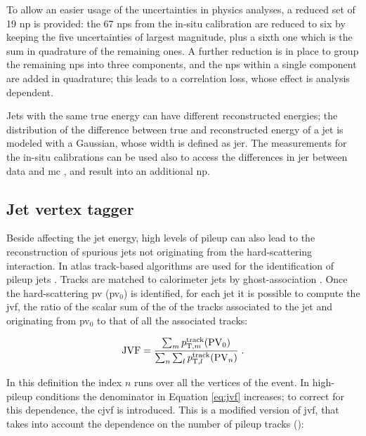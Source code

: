 To allow an easier usage of the uncertainties in physics analyses, a reduced set of 19 \gls{np} is provided: 
the 67 \glspl{np} from the in-situ calibration are reduced to six by keeping the five uncertainties of largest magnitude, 
plus a sixth one which is the sum in quadrature of the remaining ones. 
A further reduction is in place to group the remaining \glspl{np} into three components, 
and the \glspl{np} within a single component are added in quadrature; this leads to a correlation loss, whose effect is analysis dependent. 

Jets with the same true energy can have different reconstructed energies; the distribution of the difference between true and reconstructed energy of a jet is modeled with a Gaussian, whose width is defined as \gls{jer}. The measurements for the in-situ calibrations can be used also to access the differences in \gls{jer} between data and \gls{mc} \cite{ATLAS-CONF-2015-057,ATLAS-CONF-2015-017}, and result into an additional \gls{np}.

\subsection{Jet vertex tagger}
\label{sec:jvt}

Beside affecting the jet energy, high levels of pileup can also lead to the reconstruction of spurious jets not originating from the hard-scattering interaction. In \gls{atlas} track-based algorithms are used for the identification of pileup jets \cite{Aad:2015ina,ATLAS-CONF-2014-018}. 
Tracks are matched to calorimeter jets by ghost-association \cite{Soyez:2012hv}. Once the hard-scattering \gls{pv} (\gls{pv}$_0$) is identified, 
for each jet it is possible to compute the \gls{jvf}, the ratio of the scalar sum of the \pt of the tracks associated to the jet and originating from  \gls{pv}$_0$ to that of all the associated tracks:

\begin{equation}
 {\rm JVF} = \frac{\sum_m{p_{{\rm T}, m}^{{\rm track}}({\rm PV}_0)}}{\sum_n\sum_l  p_{{\rm T}, l}^{{\rm track}}({\rm PV}_n)} \; .
 \label{eq:jvf}
\end{equation} 

\noindent In this definition the index $n$ runs over all the vertices of the event. In high-pileup conditions the denominator in 
Equation \ref{eq:jvf} increases; to correct for this dependence, the \gls{cjvf} is introduced. 
This is a modified version of \gls{jvf}, that takes into account the dependence on the number of pileup tracks (\nPUtrk):


